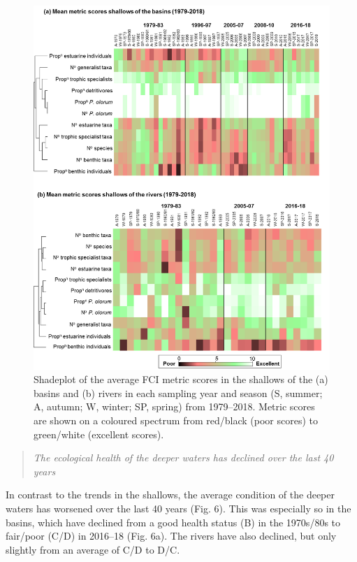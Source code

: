\documentclass[
]{book}
\begin{document}
\begin{figure}
\includegraphics[width=0.95\linewidth]{images/fish_ecology/picture7} \caption{Shadeplot of the average FCI metric scores in the shallows of the (a) basins and (b) rivers in each sampling year and season (S, summer; A, autumn; W, winter; SP, spring) from 1979–2018. Metric scores are shown on a coloured spectrum from red/black (poor scores) to green/white (excellent scores).}\label{fig:fish-ecology-pic7}
\end{figure}

\begin{quote}
\emph{The ecological health of the deeper waters has declined over the last 40 years}
\end{quote}

In contrast to the trends in the shallows, the average condition of the deeper waters has worsened over the last 40 years (Fig. 6). This was especially so in the basins, which have declined from a good health status (B) in the 1970s/80s to fair/poor (C/D) in 2016--18 (Fig. 6a). The rivers have also declined, but only slightly from an average of C/D to D/C.
\end{document}
